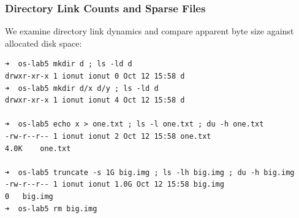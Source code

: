 \documentclass{labreport}
\begin{document}
\subsubsection{Directory Link Counts and Sparse Files}
We examine directory link dynamics and compare apparent byte size against allocated disk space:

\begin{lstlisting}[style=bash]
➜  os-lab5 mkdir d ; ls -ld d
drwxr-xr-x 1 ionut ionut 0 Oct 12 15:58 d
➜  os-lab5 mkdir d/x d/y ; ls -ld d
drwxr-xr-x 1 ionut ionut 4 Oct 12 15:58 d

➜  os-lab5 echo x > one.txt ; ls -l one.txt ; du -h one.txt
-rw-r--r-- 1 ionut ionut 2 Oct 12 15:58 one.txt
4.0K	one.txt

➜  os-lab5 truncate -s 1G big.img ; ls -lh big.img ; du -h big.img
-rw-r--r-- 1 ionut ionut 1.0G Oct 12 15:58 big.img
0	big.img
➜  os-lab5 rm big.img
\end{lstlisting}
\end{document}
